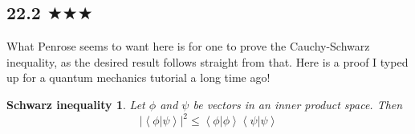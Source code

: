 
\subsection{22.2 $\bigstar \bigstar\bigstar $}
What Penrose seems to want here is for one to prove the Cauchy-Schwarz inequality, as the desired result follows straight from that. Here is a proof I typed up for a quantum mechanics tutorial a long time ago!

\newtheorem{T1}{Schwarz inequality}
\begin{T1}
Let $\phi$ and $\psi$ be vectors in an inner product space. Then 
$$|\left<\phi|\psi\right >|^2\leq \left<\phi|\phi\right >\left<\psi|\psi\right >$$
\end{T1}

